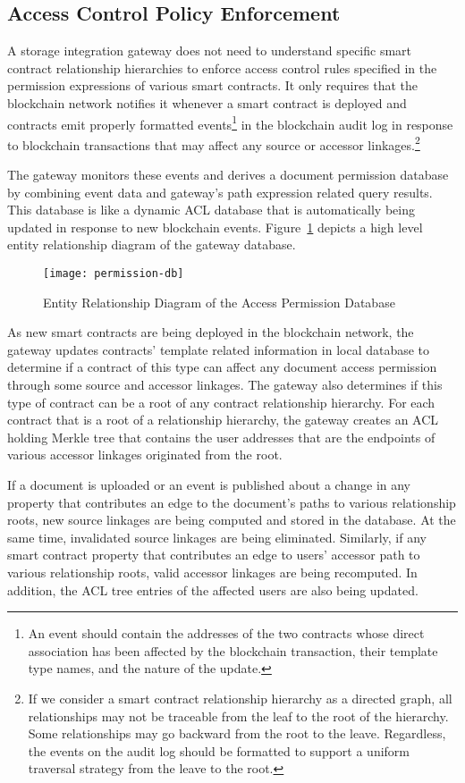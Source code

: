 \subsection{Access Control Policy Enforcement}
A storage integration gateway does not need to understand specific smart contract relationship hierarchies to enforce access control rules specified in the permission expressions of various smart contracts. It only requires that the blockchain network notifies it whenever a smart contract is deployed and contracts emit properly formatted events\footnote{An event should contain the addresses of the two contracts whose direct association has been affected by the blockchain transaction, their template type names, and the nature of the update.} in the blockchain audit log in response to blockchain transactions that may affect any source or accessor linkages.\footnote{If we consider a smart contract relationship hierarchy as a directed graph, all relationships may not be traceable from the leaf to the root of the hierarchy. Some relationships may go backward from the root to the leave. Regardless, the events on the audit log should be formatted to support a uniform traversal strategy from the leave to the root.}

The gateway monitors these events and derives a document permission database by combining event data and gateway's path expression related query results. This database is like a dynamic ACL database that is automatically being updated in response to new blockchain events. Figure~\ref{fig:perm-ERD} depicts a high level entity relationship diagram of the gateway database.
\begin{figure}[h]
\centering
\texttt{[image: permission-db]}                    
\caption{Entity Relationship Diagram of the Access Permission Database}\label{fig:perm-ERD}
\end{figure}
As new smart contracts are being deployed in the blockchain network, the gateway updates contracts' template related information in local database to determine if a contract of this type can affect any document access permission through some source and accessor linkages. The gateway also determines if this type of contract can be a root of any contract relationship hierarchy. For each contract that is a root of a relationship hierarchy, the gateway creates an ACL holding Merkle tree \cite{6233691} that contains the user addresses that are the endpoints of various accessor linkages originated from the root.

If a document is uploaded or an event is published about a change in any property that contributes an edge to the document's paths to various relationship roots, new source linkages are being computed and stored in the database. At the same time, invalidated source linkages are being eliminated. Similarly, if any smart contract property that contributes an edge to users' accessor path to various relationship roots, valid accessor linkages are being recomputed. In addition, the ACL tree entries of the affected users are also being updated.

